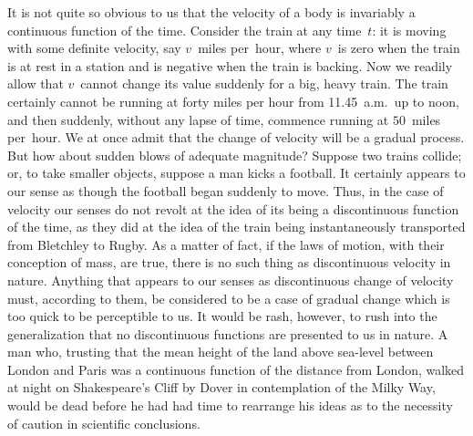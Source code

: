 \documentclass[12pt,leqno]{book}[2005/09/16]
\newcommand{\PageSep}[1]{\ignorespaces}
\begin{document}
It is not quite so obvious to us that the
velocity of a body is invariably a continuous
function of the time. Consider the train at
any time~$t$: it is moving with some definite
velocity, say $v$~miles per~hour, where $v$~is
zero when the train is at rest in a station and
is negative when the train is backing. Now
we readily allow that $v$~cannot change its
\PageSep{152}
value suddenly for a big, heavy train. The
train certainly cannot be running at forty
miles per hour from 11.45~a.m.\ up to noon,
and then suddenly, without any lapse of time,
commence running at $50$~miles per~hour. We
at once admit that the change of velocity
will be a gradual process. But how about
sudden blows of adequate magnitude? Suppose
two trains collide; or, to take smaller
objects, suppose a man kicks a football. It
certainly appears to our sense as though the
football began suddenly to move. Thus, in
the case of velocity our senses do not revolt
at the idea of its being a discontinuous function
of the time, as they did at the idea of the
train being instantaneously transported from
Bletchley to Rugby. As a matter of fact,
if the laws of motion, with their conception
of mass, are true, there is no such thing as
discontinuous velocity in nature. Anything
that appears to our senses as discontinuous
change of velocity must, according to them,
be considered to be a case of gradual change
which is too quick to be perceptible to us.
It would be rash, however, to rush into the
generalization that no discontinuous functions
are presented to us in nature. A man who,
trusting that the mean height of the land
above sea-level between London and Paris
was a continuous function of the distance
from London, walked at night on Shakespeare's
\PageSep{153}
Cliff by Dover in contemplation of
the Milky Way, would be dead before he had
had time to rearrange his ideas as to the
necessity of caution in scientific conclusions.
\end{document}
